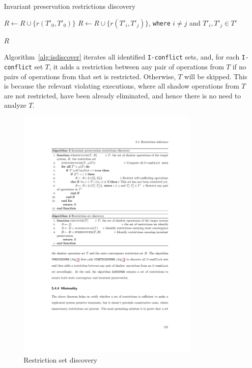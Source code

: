 \begin{algorithm}[t]
\caption{Invariant preservation restrictions discovery}
\label{alg:isdiscover}
\begin{algorithmic}[1]

\State {}

     \State $R \leftarrow R \cup \{r(T'_0, T'_0)\}$ 
   
     \State $R \leftarrow R \cup \{r(T'_i, T'_j)\}$, \texttt{where} $i \neq j$ and $T'_i, T'_j \in T'$
  \EndIf
\EndIf
\EndFor

\Return $R$
\EndFunction
\end{algorithmic}
\end{algorithm}
\fi

Algorithm~\ref{alg:isdiscover} iterates all identified {\tt I-conflict} sets, and,
for each {\tt I-conflict} set $T$, it adds a restriction between any pair of operations from $T$
if no pairs of operations from that set is restricted. Otherwise, $T$ will be skipped.
This is because the relevant violating executions, where all shadow operations from $T$
are not restricted, have been already eliminated, and hence
there is no need to analyze $T$.

\begin{figure}[th!]
\centering
\includegraphics[width=0.8\textwidth]{figures/algs/alg4.pdf}
\caption{Restriction set discovery}
\label{alg:mrdiscover}
\end{figure}

